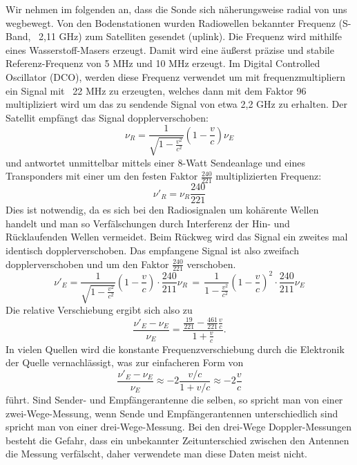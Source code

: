 Wir nehmen im folgenden an, dass die Sonde sich näherungsweise radial von uns wegbewegt.
Von den Bodenstationen wurden Radiowellen bekannter Frequenz (S-Band, ~2,11 GHz) zum Satelliten gesendet (uplink).
Die Frequenz wird mithilfe eines Wasserstoff-Masers erzeugt.
Damit wird eine äußerst präzise und stabile Referenz-Frequenz von 5 MHz und 10 MHz erzeugt. Im Digital Controlled Oscillator (DCO), werden diese Frequenz verwendet um mit frequenzmultipliern ein Signal mit ~22 MHz zu erzeugten, welches dann mit dem Faktor 96 multipliziert wird um das zu sendende Signal von etwa 2,2 GHz zu erhalten.\cite{Anderson2002}
Der Satellit empfängt das Signal dopplerverschoben:
\begin{equation}
 \nu_R = \frac{1}{\sqrt{1-\frac{v^2}{c^2}}}(1-\frac{v}{c})\nu_E
\end{equation}
und antwortet unmittelbar mittels einer 8-Watt Sendeanlage und eines Transponders
mit einer um den festen Faktor $ \frac{240}{221} $ multiplizierten Frequenz:
\begin{equation}
\nu'_R = \nu_R\frac{240}{221}
\end{equation}
Dies ist notwendig, da es sich bei den Radiosignalen um kohärente Wellen handelt und man so Verfälschungen durch Interferenz der Hin- und Rücklaufenden Wellen vermeidet.\cite{Anderson2002}
Beim Rückweg wird das Signal ein zweites mal identisch dopplerverschoben.
Das empfangene Signal ist also zweifach dopplerverschoben und um den Faktor $\frac{240}{221}$ verschoben.
\begin{equation}
 \nu'_E = \frac{1}{\sqrt{1-\frac{v^2}{c^2}}}(1-\frac{v}{c}) \cdot \frac{240}{211}\nu_R \, = \,
\frac{1}{1-\frac{v^2}{c^2}}(1-\frac{v}{c})^2 \cdot \frac{240}{211} \nu_E
\end{equation}
Die relative Verschiebung ergibt sich also zu
\begin{equation}
 \frac{\nu'_E-\nu_E}{\nu_E} = \frac{\frac{19}{221}- \frac{461}{221}\frac{v}{c}}{1+\frac{v}{c}}.
\end{equation}
In vielen Quellen wird die konstante Frequenzverschiebung durch die Elektronik der Quelle vernachlässigt, was zur
einfacheren Form von
\begin{equation}
 \frac{\nu'_E-\nu_E}{\nu_E} \approx -2\frac{v/c}{1+v/c} \approx -2 \frac{v}{c}
\end{equation}
führt.
Sind Sender- und Empfängerantenne die selben, so spricht man von einer zwei-Wege-Messung, wenn Sende und Empfängerantennen unterschiedlich sind spricht man von einer drei-Wege-Messung.\cite{Levy2009} Bei den drei-Wege Doppler-Messungen besteht die Gefahr, dass ein unbekannter Zeitunterschied zwischen den Antennen die Messung verfälscht, daher verwendete man diese Daten meist nicht.\cite{Anderson2002} %
